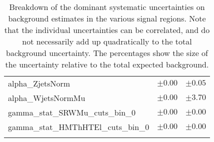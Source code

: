 \begin{table}
\begin{center}
\begin{tabular*}{\textwidth}{@{\extracolsep{\fill}}lcc}
alpha\_ZjetsNorm         & $\pm 0.00$          & $\pm 0.05$       \\
alpha\_WjetsNormMu         & $\pm 0.00$          & $\pm 3.70$       \\
gamma\_stat\_SRWMu\_cuts\_bin\_0         & $\pm 0.00$          & $\pm 0.00$       \\
gamma\_stat\_HMThHTEl\_cuts\_bin\_0         & $\pm 0.00$          & $\pm 0.00$       \\
\noalign{\smallskip}\hline\noalign{\smallskip}
\end{tabular*}
\end{center}
\caption[Breakdown of uncertainty on background estimates]{
Breakdown of the dominant systematic uncertainties on background estimates in the various signal regions.
Note that the individual uncertainties can be correlated, and do not necessarily add up quadratically to 
the total background uncertainty. The percentages show the size of the uncertainty relative to the total expected background.
\label{table.results.bkgestimate.uncertainties.HMEThHTEl_HMEThHTMu}}
\end{table}
%